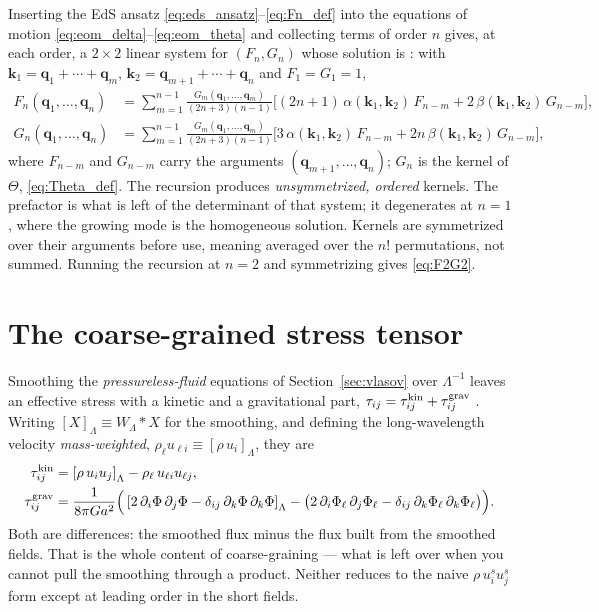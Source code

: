 \documentclass[a4paper,11pt]{article}
\newcommand{\vq}{\bm{q}}
\newcommand{\vk}{\bm{k}}
\numberwithin{equation}{section}
\begin{document}
Inserting the EdS ansatz \eqref{eq:eds_ansatz}--\eqref{eq:Fn_def} into the equations of motion
\eqref{eq:eom_delta}--\eqref{eq:eom_theta} and collecting terms of order $n$
gives, at each order, a $2\times2$ linear system for $(F_n, G_n)$ whose solution
is \cite[Eqs.~(43)--(44)]{Bernardeau2002}: with $\vk_1 = \vq_1+\cdots+\vq_m$,
$\vk_2 = \vq_{m+1}+\cdots+\vq_n$ and $F_1 = G_1 = 1$,
\begin{align}
F_n(\vq_1,\ldots,\vq_n) &= \sum_{m=1}^{n-1}
\frac{G_m(\vq_1,\ldots,\vq_m)}{(2n+3)(n-1)}
\Big[(2n+1)\,\alpha(\vk_1,\vk_2)\,F_{n-m}
+ 2\,\beta(\vk_1,\vk_2)\,G_{n-m}\Big] ,
\label{eq:Fn_recursion}\\
G_n(\vq_1,\ldots,\vq_n) &= \sum_{m=1}^{n-1}
\frac{G_m(\vq_1,\ldots,\vq_m)}{(2n+3)(n-1)}
\Big[3\,\alpha(\vk_1,\vk_2)\,F_{n-m}
+ 2n\,\beta(\vk_1,\vk_2)\,G_{n-m}\Big] ,
\label{eq:Gn_recursion}
\end{align}
where $F_{n-m}$ and $G_{n-m}$ carry the arguments $(\vq_{m+1},\ldots,\vq_n)$;
$G_n$ is the kernel of $\Theta$, \eqref{eq:Theta_def}. The recursion produces
\emph{unsymmetrized, ordered} kernels.
The prefactor is what is left of the determinant of that system; it degenerates
at $n=1$, where the growing mode is the homogeneous solution. Kernels are
symmetrized over their arguments before use, meaning averaged over the $n!$
permutations, not summed. Running the recursion at $n=2$ and symmetrizing gives
\eqref{eq:F2G2}.

\section{The coarse-grained stress tensor}
\label{app:tau}

Smoothing the \emph{pressureless-fluid} equations of Section~\ref{sec:vlasov}
over $\Lambda^{-1}$ leaves an effective stress with a kinetic and a
gravitational part, $\tau_{ij} = \tau^{\rm kin}_{ij} + \tau^{\rm grav}_{ij}$
\cite[App.~A]{Baumann2010}. Writing $[X]_\Lambda \equiv W_\Lambda * X$ for the
smoothing, and defining the long-wavelength velocity \emph{mass-weighted},
$\rho_\ell u_{\ell i} \equiv [\rho\,u_i]_\Lambda$, they are
\begin{align}
\tau^{\rm kin}_{ij} &= \left[\rho\,u_iu_j\right]_\Lambda
- \rho_\ell\,u_{\ell i}u_{\ell j} ,
\label{eq:tau_kin}\\
\tau^{\rm grav}_{ij} &= \frac{1}{8\pi G a^2}\Big(
\left[2\,\partial_i\Phi\,\partial_j\Phi
- \delta_{ij}\,\partial_k\Phi\,\partial_k\Phi\right]_\Lambda
- \big(2\,\partial_i\Phi_\ell\,\partial_j\Phi_\ell
- \delta_{ij}\,\partial_k\Phi_\ell\,\partial_k\Phi_\ell\big)\Big) .
\label{eq:tau_grav}
\end{align}
Both are differences: the smoothed flux minus the flux built from the smoothed
fields. That is the whole content of coarse-graining --- what is left over when
you cannot pull the smoothing through a product. Neither reduces to the naive
$\rho\,u^s_iu^s_j$ form except at leading order in the short fields.
\end{document}
